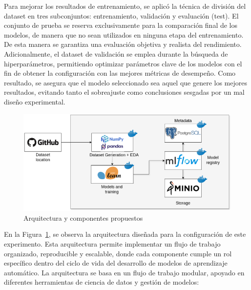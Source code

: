 \documentclass[11pt,a4paper,spanish]{book}
\numberwithin{equation}{chapter}
\numberwithin{figure}{chapter}
\begin{document}
Para mejorar los resultados de entrenamiento, se aplicó la técnica de división del 
dataset en tres subconjuntos: entrenamiento, validación y evaluación (test). 
El conjunto de prueba se reserva exclusivamente para la comparación final de los modelos,
de manera que no sean utilizados en ninguna etapa del entrenamiento. 
De esta manera se garantiza una evaluación objetiva y realista del rendimiento. 
Adicionalmente, el dataset de validación se emplea durante la búsqueda de 
hiperparámetros, permitiendo optimizar parámetros clave de los modelos con el fin de 
obtener la configuración con las mejores métricas de desempeño. Como resultado, se 
asegura que el modelo seleccionado sea aquel que genere los mejores resultados, evitando
tanto el sobreajuste como conclusiones sesgadas por un mal diseño experimental.

\begin{figure}[h]
    \centering
    \includegraphics[width=1\textwidth]{media/arquitecura.png}
    \caption{Arquitectura y componentes propuestos  }
    \label{fig:figArchitecture}
\end{figure}

En la Figura~\ref{fig:figArchitecture}, se observa la arquitectura diseñada para la 
configuración de este experimento. Esta arquitectura permite implementar un flujo de 
trabajo organizado, reproducible y escalable, donde cada componente cumple un rol 
específico dentro del ciclo de vida del desarrollo de modelos de aprendizaje automático.
La arquitectura se basa en un flujo de trabajo modular, apoyado en diferentes 
herramientas de ciencia de datos y gestión de modelos:
\end{document}
